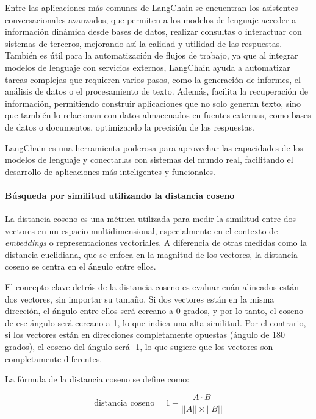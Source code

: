 Entre las aplicaciones más comunes de LangChain se encuentran los asistentes conversacionales avanzados, que permiten a los modelos de lenguaje acceder a información dinámica desde bases de datos, realizar consultas o interactuar con sistemas de terceros, mejorando así la calidad y utilidad de las respuestas. También es útil para la automatización de flujos de trabajo, ya que al integrar modelos de lenguaje con servicios externos, LangChain ayuda a automatizar tareas complejas que requieren varios pasos, como la generación de informes, el análisis de datos o el procesamiento de texto. Además, facilita la recuperación de información, permitiendo construir aplicaciones que no solo generan texto, sino que también lo relacionan con datos almacenados en fuentes externas, como bases de datos o documentos, optimizando la precisión de las respuestas.

LangChain es una herramienta poderosa para aprovechar las capacidades de los modelos de lenguaje y conectarlas con sistemas del mundo real, facilitando el desarrollo de aplicaciones más inteligentes y funcionales.

\paragraph{Búsqueda por similitud utilizando la distancia coseno}

La distancia coseno es una métrica utilizada para medir la similitud entre dos vectores en un espacio multidimensional, especialmente en el contexto de \textit{embeddings} o representaciones vectoriales. A diferencia de otras medidas como la distancia euclidiana, que se enfoca en la magnitud de los vectores, la distancia coseno se centra en el ángulo entre ellos.

El concepto clave detrás de la distancia coseno es evaluar cuán alineados están dos vectores, sin importar su tamaño. Si dos vectores están en la misma dirección, el ángulo entre ellos será cercano a 0 grados, y por lo tanto, el coseno de ese ángulo será cercano a 1, lo que indica una alta similitud. Por el contrario, si los vectores están en direcciones completamente opuestas (ángulo de 180 grados), el coseno del ángulo será -1, lo que sugiere que los vectores son completamente diferentes.

La fórmula de la distancia coseno se define como:

\begin{equation}
\text{distancia coseno} = 1 - \frac{A \cdot B}{||A|| \times ||B||}
\end{equation}

